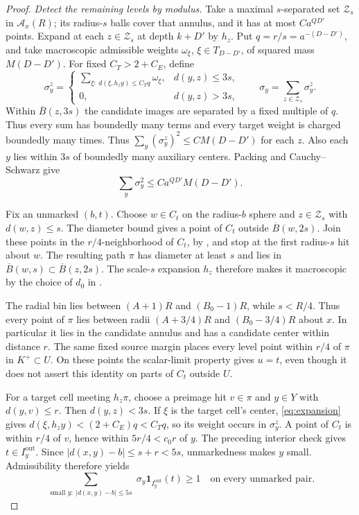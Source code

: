 \begin{proof}
\emph{Detect the remaining levels by modulus.}
Take a maximal $s$-separated set $\mathcal Z_s$ in $\mathcal A_x(R)$;
its radius-$s$ balls cover that annulus, and it has at most $Ca^{QD'}$ points. Expand at
each $z\in\mathcal Z_s$ at depth $k+D'$ by $h_z$. Put
$q=r/s=a^{-(D-D')}$, and take macroscopic admissible weights
$\omega_\xi$, $\xi\in T_{D-D'}$, of squared mass $M(D-D')$.
For fixed $C_T>2+C_E$, define
\[
 \sigma_y^z=
 \begin{cases}
 \displaystyle\sum_{\xi:\ d(\xi,h_zy)\leq C_Tq}\omega_\xi,
       &d(y,z)\leq3s,\\[3pt]
 0,&d(y,z)>3s,
 \end{cases}
 \qquad \sigma_y=\sum_{z\in\mathcal Z_s}\sigma_y^z.
\]
Within $\overline B(z,3s)$ the candidate images are separated by a
fixed multiple of $q$. Thus every sum has boundedly many terms and
every target weight is charged boundedly many times. Thus
$\sum_y(\sigma_y^z)^2\leq CM(D-D')$ for each $z$. Also each $y$
lies within $3s$ of boundedly many auxiliary centers. Packing and
Cauchy--Schwarz give
\begin{equation}
 \sum_y\sigma_y^2\leq Ca^{QD'}M(D-D').
 \label{eq:capacity-transfer-energy}
\end{equation}

Fix an unmarked $(b,t)$. Choose $w\in C_t$ on the radius-$b$ sphere
and $z\in\mathcal Z_s$ with $d(w,z)\leq s$. The diameter bound gives
a point of $C_t$ outside $\overline B(w,2s)$. Join these points in the
$r/4$-neighborhood of $C_t$, by , and stop at the first
radius-$s$ hit about $w$. The resulting path $\pi$ has diameter at
least $s$ and lies in $\overline B(w,s)\subset\overline B(z,2s)$.
The scale-$s$ expansion $h_z$ therefore makes it macroscopic by the
choice of $d_0$ in .

The radial bin lies between $(A+1)R$ and $(B_0-1)R$, while $s<R/4$.
Thus every point of $\pi$ lies between radii $(A+3/4)R$ and
$(B_0-3/4)R$ about $x$. In particular it lies in the candidate
annulus and has a candidate center within distance $r$. The same
fixed source margin places every level point within $r/4$ of $\pi$
in $K^+\subset U$. On these points the scalar-limit property gives
$u=t$, even though it does not assert this identity on parts of
$C_t$ outside $U$.

For a target cell meeting $h_z\pi$, choose a preimage hit $v\in\pi$
and $y\in Y$ with $d(y,v)\leq r$. Then $d(y,z)<3s$. If $\xi$ is the target cell's center,
\eqref{eq:expansion} gives $d(\xi,h_zy)<(2+C_E)q<C_Tq$, so its
weight occurs in $\sigma_y^z$. A point of $C_t$ is within $r/4$ of
$v$, hence within $5r/4<c_0r$ of $y$. The preceding interior check
gives $t\in I_y^{\mathrm{out}}$. Since
$|d(x,y)-b|\leq s+r<5s$, unmarkedness makes $y$ small. Admissibility
therefore yields
\begin{equation}
 \sum_{\substack{\text{small }y:\ |d(x,y)-b|\leq5s}}
 \sigma_y\mathbf1_{I_y^{\mathrm{out}}}(t)\geq1
 \quad\text{on every unmarked pair}.
 \label{eq:unmarked-indicator}
\end{equation}


\end{proof}
